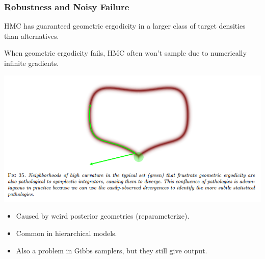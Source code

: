 \documentclass[xcolor=dvipsnames]{beamer}
\begin{document}
\begin{frame}
\frametitle{Robustness and Noisy Failure}
HMC has guaranteed geometric ergodicity in a larger class of target densities than alternatives.

\vspace{0.5cm}

When geometric ergodicity fails, HMC often won't sample due to numerically infinite gradients.
\begin{center}
\includegraphics[height = 0.4\textheight]{divergent.png}
\end{center}
\begin{itemize}
\item Caused by weird posterior geometries (reparameterize).
\item Common in hierarchical models.
\item Also a problem in Gibbs samplers, but they still give output.
\end{itemize}
\end{frame}
\end{document}
